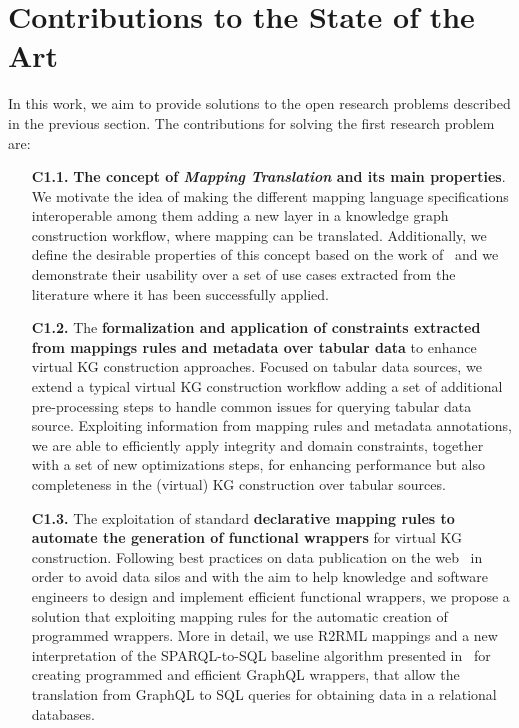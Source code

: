 \section{Contributions to the State of the Art}
In this work, we aim to provide solutions to the open research problems described in the previous section. The contributions for solving the first research problem are:

\begin{enumerate}
    \item[\textbf{C1.1.}] \textbf{The concept of \textit{Mapping Translation} and its main properties}. We motivate the idea of making the different mapping language specifications interoperable among them adding a new layer in a knowledge graph construction workflow, where mapping can be translated. Additionally, we define the desirable properties of this concept based on the work of~\citep{hartig2017foundations} and we demonstrate their usability over a set of use cases extracted from the literature where it has been successfully applied.
    \item[\textbf{C1.2.}] The \textbf{formalization and application of constraints extracted from mappings rules and metadata over tabular data} to enhance virtual KG construction approaches. Focused on tabular data sources, we extend a typical virtual KG construction workflow adding a set of additional pre-processing steps to handle common issues for querying tabular data source. Exploiting information from mapping rules and metadata annotations, we are able to efficiently apply integrity and domain constraints, together with a set of new optimizations steps, for enhancing performance but also completeness in the (virtual) KG construction over tabular sources.
    \item[\textbf{C1.3.}] The exploitation of standard \textbf{declarative mapping rules to automate the generation of functional wrappers} for virtual KG construction. Following best practices on data publication on the web~\citep{bizer2011linked} in order to avoid data silos and with the aim to help knowledge and software engineers to design and implement efficient functional wrappers, we propose a solution that exploiting mapping rules for the automatic creation of programmed wrappers. More in detail, we use R2RML mappings and a new interpretation of the SPARQL-to-SQL baseline algorithm presented in~\citep{chebotko2009semantics} for creating programmed and efficient GraphQL wrappers, that allow the translation from GraphQL to SQL queries for obtaining data in a relational databases.

\end{enumerate}
